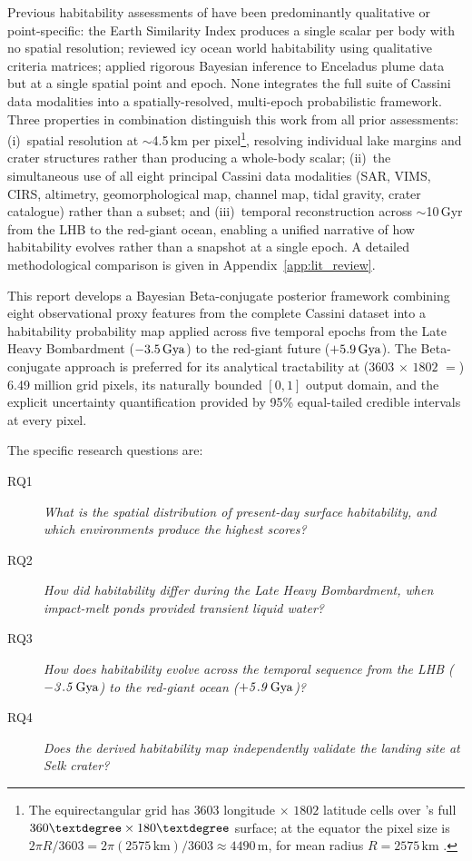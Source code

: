 Previous habitability assessments of \titan{} have been predominantly qualitative
or point-specific: the Earth Similarity Index \citep{Schulze-Makuch2011}
produces a single scalar per body with no spatial resolution;
\citet{Hendrix2019} reviewed icy ocean world habitability using qualitative
criteria matrices; \citet{Affholder2021} applied rigorous Bayesian inference
to Enceladus plume data but at a single spatial point and epoch.  None
integrates the full suite of Cassini data modalities into a spatially-resolved,
multi-epoch probabilistic framework.  Three properties in combination distinguish
this work from all prior assessments: (i)~spatial resolution at $\sim$4.5\,km per pixel\footnote{The equirectangular grid has $3603$ longitude $\times$ $1802$ latitude cells over \titan{}'s full $360\textdegree\times180\textdegree$ surface; at the equator the pixel size is $2\pi R/3603 = 2\pi(2575\,\mathrm{km})/3603 \approx 4490\,\mathrm{m}$, for mean radius $R = 2575\,\mathrm{km}$ \citep{Archinal2018}.},
resolving individual lake margins and crater structures rather than producing a
whole-body scalar; (ii)~the simultaneous use of all eight principal Cassini
data modalities (SAR, VIMS, CIRS, altimetry, geomorphological map, channel map,
tidal gravity, crater catalogue) rather than a subset; and (iii)~temporal
reconstruction across $\sim$10\,Gyr from the LHB to the red-giant ocean,
enabling a unified narrative of how habitability evolves rather than a
snapshot at a single epoch.  A detailed methodological comparison is
given in Appendix~\ref{app:lit_review}.

This report develops a Bayesian Beta-conjugate posterior framework combining
eight observational proxy features from the complete Cassini dataset into a
habitability probability map applied across five temporal epochs from the Late Heavy Bombardment ($-3.5\,\text{Gya}$)
to the red-giant future ($+5.9\,\text{Gya}$).  The Beta-conjugate approach is preferred
for its analytical tractability at ($3603$ $\times$ $1802$ $=$) 6.49 million grid pixels, its naturally
bounded $[0,1]$ output domain, and the explicit uncertainty quantification
provided by 95\% equal-tailed credible intervals at every pixel.

The specific research questions are:
\begin{description}
  \item[RQ1] \textit{What is the spatial distribution of present-day surface
    habitability, and which environments produce the highest scores?}

  \item[RQ2] \textit{How did habitability differ during the Late Heavy
    Bombardment, when impact-melt ponds provided transient liquid water?}

  \item[RQ3] \textit{How does habitability evolve across the temporal sequence
    from the LHB ($\mathit{-3.5\,\text{Gya}}$) to the red-giant ocean ($\mathit{+5.9\,\text{Gya}}$)?}

  \item[RQ4] \textit{Does the derived habitability map independently validate
    the \dragonfly{} landing site at Selk crater?}
\end{description}
